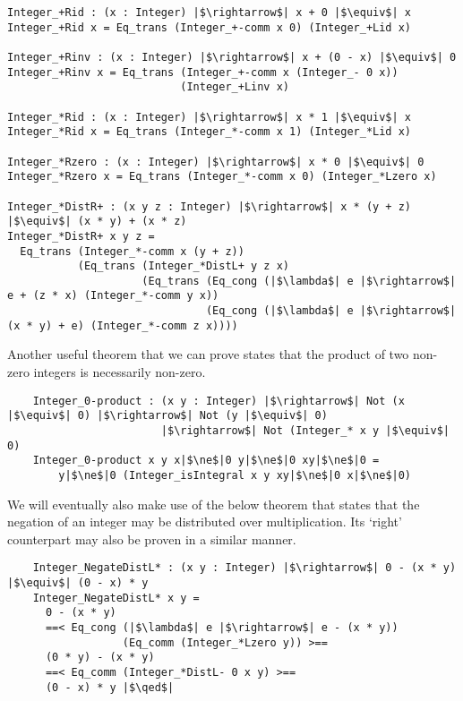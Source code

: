\documentclass[12pt,twoside,maitrise]{dms}
\theoremstyle{definition}
\numberwithin{equation}{section}
\numberwithin{table}{chapter}
\numberwithin{figure}{chapter}
\renewcommand\qed{\blacksquare}
\begin{document}
\begin{verbatim}
Integer_+Rid : (x : Integer) |$\rightarrow$| x + 0 |$\equiv$| x
Integer_+Rid x = Eq_trans (Integer_+-comm x 0) (Integer_+Lid x)

Integer_+Rinv : (x : Integer) |$\rightarrow$| x + (0 - x) |$\equiv$| 0
Integer_+Rinv x = Eq_trans (Integer_+-comm x (Integer_- 0 x))
                           (Integer_+Linv x)

Integer_*Rid : (x : Integer) |$\rightarrow$| x * 1 |$\equiv$| x
Integer_*Rid x = Eq_trans (Integer_*-comm x 1) (Integer_*Lid x)

Integer_*Rzero : (x : Integer) |$\rightarrow$| x * 0 |$\equiv$| 0
Integer_*Rzero x = Eq_trans (Integer_*-comm x 0) (Integer_*Lzero x)

Integer_*DistR+ : (x y z : Integer) |$\rightarrow$| x * (y + z) |$\equiv$| (x * y) + (x * z)
Integer_*DistR+ x y z =
  Eq_trans (Integer_*-comm x (y + z))
           (Eq_trans (Integer_*DistL+ y z x)
                     (Eq_trans (Eq_cong (|$\lambda$| e |$\rightarrow$| e + (z * x) (Integer_*-comm y x))
                               (Eq_cong (|$\lambda$| e |$\rightarrow$| (x * y) + e) (Integer_*-comm z x))))
\end{verbatim}

Another useful theorem that we can prove states that the product of two non-zero integers is necessarily non-zero.

\begin{verbatim}
    Integer_0-product : (x y : Integer) |$\rightarrow$| Not (x |$\equiv$| 0) |$\rightarrow$| Not (y |$\equiv$| 0)
                        |$\rightarrow$| Not (Integer_* x y |$\equiv$| 0)
    Integer_0-product x y x|$\ne$|0 y|$\ne$|0 xy|$\ne$|0 =
        y|$\ne$|0 (Integer_isIntegral x y xy|$\ne$|0 x|$\ne$|0)
\end{verbatim}

We will eventually also make use of the below theorem that states that the negation of an integer may be distributed over multiplication. Its `right' counterpart may also be proven in a similar manner.

\begin{verbatim}
    Integer_NegateDistL* : (x y : Integer) |$\rightarrow$| 0 - (x * y) |$\equiv$| (0 - x) * y
    Integer_NegateDistL* x y =
      0 - (x * y)
      ==< Eq_cong (|$\lambda$| e |$\rightarrow$| e - (x * y))
                  (Eq_comm (Integer_*Lzero y)) >==
      (0 * y) - (x * y)
      ==< Eq_comm (Integer_*DistL- 0 x y) >==
      (0 - x) * y |$\qed$|
\end{verbatim}
\end{document}
